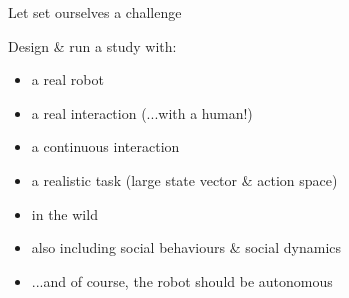 \documentclass[xcolor=table]{beamer}
\begin{document}
\begin{frame}{Let set ourselves a challenge}

\begin{exampleblock}{Design \& run a study with:}
    
    \begin{itemize}
        \item<+-> a real robot
        \item<+-> a real interaction (...with a human!)
        \item<+-> a continuous interaction
        \item<+-> a realistic task (large state vector \& action space)
        \item<+-> in the wild
        \item<+-> also including social behaviours \& social dynamics
        \item<+-> ...and of course, the robot should be autonomous
    \end{itemize}
\end{exampleblock}

\end{frame}


\end{document}
